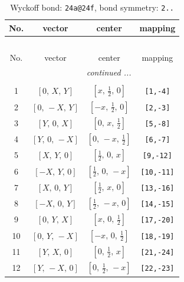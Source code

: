 \documentclass[fleqn,8pt]{jsarticle}
\begin{document}
\begin{longtable}{cccc}
\caption{Wyckoff bond: {\tt 24a@24f}, bond symmetry: {\tt 2..}}
 \\
 \hline \hline
No. & vector & center & mapping \\ \hline \endfirsthead

\multicolumn{3}{l}{\tablename\ \thetable{}} \\
 \hline \hline
No. & vector & center & mapping \\ \hline \endhead

 \hline \hline
\multicolumn{3}{r}{\footnotesize\it continued ...} \\ \endfoot

 \hline \hline
\multicolumn{3}{r}{} \\ \endlastfoot

1 & $\left[ 0,\, X,\, Y \right]$ & $\left[ x,\, \frac{1}{2},\, 0 \right]$ & {\tt [1,-4]} \\ \hline
2 & $\left[ 0,\, - X,\, Y \right]$ & $\left[ - x,\, \frac{1}{2},\, 0 \right]$ & {\tt [2,-3]} \\ \hline
3 & $\left[ Y,\, 0,\, X \right]$ & $\left[ 0,\, x,\, \frac{1}{2} \right]$ & {\tt [5,-8]} \\ \hline
4 & $\left[ Y,\, 0,\, - X \right]$ & $\left[ 0,\, - x,\, \frac{1}{2} \right]$ & {\tt [6,-7]} \\ \hline
5 & $\left[ X,\, Y,\, 0 \right]$ & $\left[ \frac{1}{2},\, 0,\, x \right]$ & {\tt [9,-12]} \\ \hline
6 & $\left[ - X,\, Y,\, 0 \right]$ & $\left[ \frac{1}{2},\, 0,\, - x \right]$ & {\tt [10,-11]} \\ \hline
7 & $\left[ X,\, 0,\, Y \right]$ & $\left[ \frac{1}{2},\, x,\, 0 \right]$ & {\tt [13,-16]} \\ \hline
8 & $\left[ - X,\, 0,\, Y \right]$ & $\left[ \frac{1}{2},\, - x,\, 0 \right]$ & {\tt [14,-15]} \\ \hline
9 & $\left[ 0,\, Y,\, X \right]$ & $\left[ x,\, 0,\, \frac{1}{2} \right]$ & {\tt [17,-20]} \\ \hline
10 & $\left[ 0,\, Y,\, - X \right]$ & $\left[ - x,\, 0,\, \frac{1}{2} \right]$ & {\tt [18,-19]} \\ \hline
11 & $\left[ Y,\, X,\, 0 \right]$ & $\left[ 0,\, \frac{1}{2},\, x \right]$ & {\tt [21,-24]} \\ \hline
12 & $\left[ Y,\, - X,\, 0 \right]$ & $\left[ 0,\, \frac{1}{2},\, - x \right]$ & {\tt [22,-23]} \\
\end{longtable}
\end{document}
